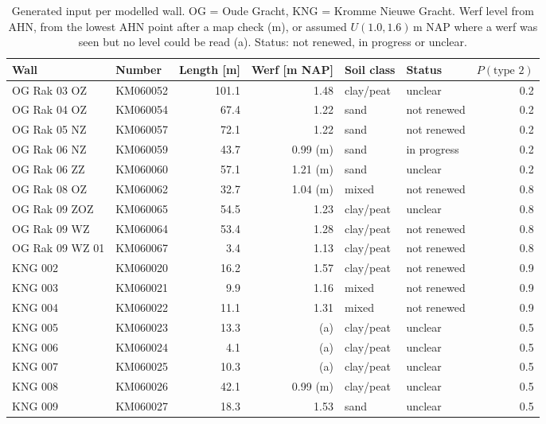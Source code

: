 \begin{table}[htbp]
\centering
\small
\caption{Generated input per modelled wall. OG = Oude Gracht, KNG = Kromme
Nieuwe Gracht. Werf level from AHN, from the lowest AHN point after a map
check (m), or assumed $U(1.0, 1.6)$\,m NAP where a werf was seen but no level
could be read (a). Status: not renewed, in progress or unclear.}
\label{tab:wall-inputs}
\begin{tabular}{@{}l l r r l l r@{}}
\toprule
Wall & Number & Length [m] & Werf [m NAP] & Soil class & Status & $P(\text{type 2})$ \\
\midrule
OG Rak 03 OZ  & KM060052 & 101.1 & 1.48     & clay/peat & unclear     & 0.2 \\
OG Rak 04 OZ  & KM060054 &  67.4 & 1.22     & sand      & not renewed & 0.2 \\
OG Rak 05 NZ  & KM060057 &  72.1 & 1.22     & sand      & not renewed & 0.2 \\
OG Rak 06 NZ  & KM060059 &  43.7 & 0.99 (m) & sand      & in progress & 0.2 \\
OG Rak 06 ZZ  & KM060060 &  57.1 & 1.21 (m) & sand      & unclear     & 0.2 \\
OG Rak 08 OZ  & KM060062 &  32.7 & 1.04 (m) & mixed     & not renewed & 0.8 \\
OG Rak 09 ZOZ & KM060065 &  54.5 & 1.23     & clay/peat & unclear     & 0.8 \\
OG Rak 09 WZ  & KM060064 &  53.4 & 1.28     & clay/peat & not renewed & 0.8 \\
OG Rak 09 WZ 01 & KM060067 & 3.4 & 1.13     & clay/peat & not renewed & 0.8 \\
KNG 002       & KM060020 &  16.2 & 1.57     & clay/peat & not renewed & 0.9 \\
KNG 003       & KM060021 &   9.9 & 1.16     & mixed     & not renewed & 0.9 \\
KNG 004       & KM060022 &  11.1 & 1.31     & mixed     & not renewed & 0.9 \\
KNG 005       & KM060023 &  13.3 & (a)      & clay/peat & unclear     & 0.5 \\
KNG 006       & KM060024 &   4.1 & (a)      & clay/peat & unclear     & 0.5 \\
KNG 007       & KM060025 &  10.3 & (a)      & clay/peat & unclear     & 0.5 \\
KNG 008       & KM060026 &  42.1 & 0.99 (m) & clay/peat & unclear     & 0.5 \\
KNG 009       & KM060027 &  18.3 & 1.53     & sand      & unclear     & 0.5 \\
\bottomrule
\end{tabular}
\end{table}

